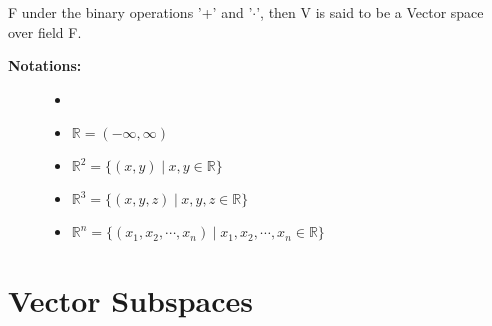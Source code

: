 \documentclass[a4paper, titlepage]{article}
\begin{document}
F under the binary operations '+' and '$\cdot$', then V is said to
be a Vector space over field F.
\begin{description}
    \item[\textbf{Notations:}] 
        \begin{itemize}
            \item[]
            \item $\mathbb{R} = (-\infty, \infty)$
            \item $\mathbb{R}^2 = \{ (x, y) \hspace{3pt} | \hspace{3pt} x, y \in \mathbb{R} \}$
            \item $\mathbb{R}^3 = \{ (x, y, z) \hspace{3pt} | \hspace{3pt} x, y, z \in \mathbb{R} \}$
            \item $\mathbb{R}^n = \{ (x_1, x_2, \cdots, x_n) \hspace{3pt} | \hspace{3pt} x_1, x_2, \cdots, x_n \in \mathbb{R} \}$
        \end{itemize}
    \item[]  
\end{description}



\section{Vector Subspaces}


\begin{center}
    \date{$7^{\text{th}}$ September 2021}
\end{center}
\end{document}
